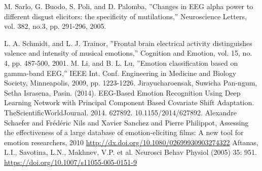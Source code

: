 \documentclass[10pt,journal,compsoc,twoside]{IEEEtran}
\begin{document}
\begin{thebibliography}{99}
 M. Sarlo, G. Buodo, S. Poli, and D. Palomba, ”Changes in EEG alpha
power to different disgust elicitors: the specificity of mutilations,”
Neuroscience Letters, vol. 382, no.3, pp. 291-296, 2005.

 L. A. Schmidt, and L. J. Trainor, ”Frontal brain electrical activity
distinguishes valence and intensity of musical emotions,” Cognition
and Emotion, vol. 15, no. 4, pp. 487-500, 2001.
M. Li, and B. L. Lu, ”Emotion classification based on gamma-band
EEG,” IEEE Int. Conf. Engineering in Medicine and Biology Society,
Minneapolis, 2009, pp. 1223-1226.
Jirayucharoensak, Suwicha  Pan-ngum, Setha  Israsena, Pasin. (2014). EEG-Based Emotion Recognition Using Deep Learning Network with Principal Component Based Covariate Shift Adaptation. TheScientificWorldJournal. 2014. 627892. 10.1155/2014/627892.
Alexandre   Schaefer  and  Frédéric   Nils  and  Xavier   Sanchez  and  Pierre   Philippot,
Assessing the effectiveness of a large database of emotion-eliciting films: A new tool for emotion researchers, 2010
\url{http://dx.doi.org/10.1080/02699930903274322}
Aftanas, L.I., Savotina, L.N., Makhnev, V.P. et al. Neurosci Behav Physiol (2005) 35: 951.\url{ https://doi.org/10.1007/s11055-005-0151-9}

\end{thebibliography}
\end{document}
